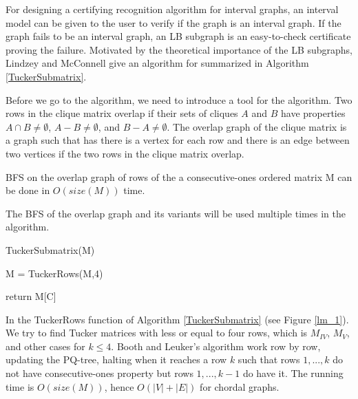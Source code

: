 For designing a certifying recognition algorithm for interval graphs, an interval model can be given to the user to verify if the graph is an interval graph. If the graph fails to be an interval graph, an LB subgraph is an easy-to-check certificate proving the failure. Motivated by the theoretical importance of the LB subgraphs, Lindzey and McConnell\cite{lindzey2016linear} give an algorithm for summarized in Algorithm \ref{TuckerSubmatrix}.

Before we go to the algorithm, we need to introduce a tool for the algorithm. Two rows in the clique matrix overlap if their sets of cliques $A$ and $B$ have properties $A \cap B \neq \emptyset$, $A-B \neq \emptyset$, and $B-A \neq \emptyset$. The overlap graph of the clique matrix is a graph such that has there is a vertex for each row and there is an edge between two vertices if the two rows in the clique matrix overlap. 

\begin{lemma}
\label{overlapbfs}
BFS on the overlap graph of rows of the a consecutive-ones ordered matrix M can be done in $O(size(M))$ time.
\end{lemma}

The BFS of the overlap graph and its variants will be used multiple times in the algorithm. 



\begin{algorithm}[H]

\SetAlgoLined
\caption{TuckerSubmatrix(M)}
\label{TuckerSubmatrix}
\Begin
{    
	M = TuckerRows(M,4) 
    
    
    return M[C]
}       
\end{algorithm}

In the TuckerRows function of Algorithm \ref{TuckerSubmatrix} (see Figure \ref{lm_1}). We try to find Tucker matrices with less or equal to four rows, which is $M_{IV}$, $M_{V}$, and other cases for $k \le 4$. Booth and Leuker's algorithm work row by row, updating the PQ-tree, halting when it reaches a row $k$ such that rows $1,...,k$ do not have consecutive-ones property but rows $1,...,k-1$ do have it. The running time is $O(size(M))$, hence $O(|V|+|E|)$ for chordal graphs.


